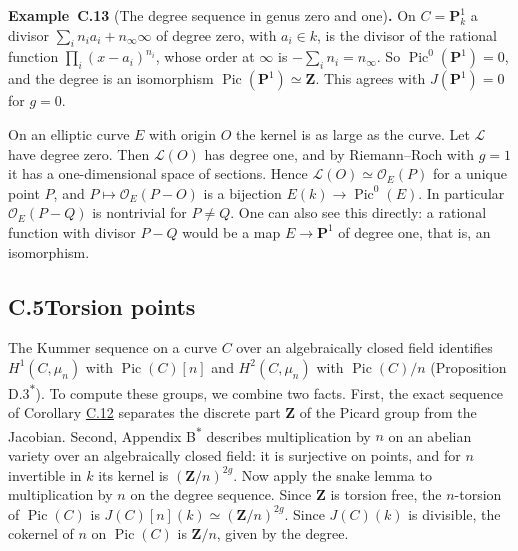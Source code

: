 \documentclass[11pt]{article}
\newenvironment{bpstatement}[2]{\par\addvspace{0.6\baselineskip}\noindent\textbf{#1}#2\textbf{.}\enspace\ignorespaces}
  {\par\addvspace{0.4\baselineskip}}
\newcommand{\bpout}[1]{#1\textsuperscript{\hyperlink{bp-outside}{\ensuremath{\ast}}}}
\begin{document}
\label{bp41}%
\begin{bpstatement}{Example~C.13}{ (The degree sequence in genus zero and one)}
On \(C=\mathbf P^1_k\) a divisor \(\sum_in_ia_i+n_\infty\infty\) of degree zero, with \(a_i\in k\), is the divisor of the rational function \(\prod_i(x-a_i)^{n_i}\), whose order at \(\infty\) is \(-\sum_in_i=n_\infty\). So \(\operatorname{Pic}^0(\mathbf P^1)=0\), and the degree is an isomorphism \(\operatorname{Pic}(\mathbf P^1)\simeq\mathbf Z\). This agrees with \(J(\mathbf P^1)=0\) for \(g=0\).

On an elliptic curve \(E\) with origin \(O\) the kernel is as large as the curve. Let \(\mathcal L\) have degree zero. Then \(\mathcal L(O)\) has degree one, and by Riemann–Roch with \(g=1\) it has a one-dimensional space of sections. Hence \(\mathcal L(O)\simeq\mathcal O_E(P)\) for a unique point \(P\), and \(P\mapsto\mathcal O_E(P-O)\) is a bijection \(E(k)\to\operatorname{Pic}^0(E)\). In particular \(\mathcal O_E(P-Q)\) is nontrivial for \(P\neq Q\). One can also see this directly: a rational function with divisor \(P-Q\) would be a map \(E\to\mathbf P^1\) of degree one, that is, an isomorphism.
\end{bpstatement}


\subsection*{\texorpdfstring{C.5\quad Torsion points}{C.5 Torsion points}}
\label{bp42}%
\label{bp43}%
The Kummer sequence on a curve \(C\) over an algebraically closed field identifies \(H^1(C,\mu_n)\) with \(\operatorname{Pic}(C)[n]\) and \(H^2(C,\mu_n)\) with \(\operatorname{Pic}(C)/n\) (Proposition \bpout{D.3}). To compute these groups, we combine two facts. First, the exact sequence of Corollary \hyperref[bp39]{C.12} separates the discrete part \(\mathbf Z\) of the Picard group from the Jacobian. Second, Appendix \bpout{B} describes multiplication by \(n\) on an abelian variety over an algebraically closed field: it is surjective on points, and for \(n\) invertible in \(k\) its kernel is \((\mathbf Z/n)^{2g}\). Now apply the snake lemma to multiplication by \(n\) on the degree sequence. Since \(\mathbf Z\) is torsion free, the \(n\)-torsion of \(\operatorname{Pic}(C)\) is \(J(C)[n](k)\simeq(\mathbf Z/n)^{2g}\). Since \(J(C)(k)\) is divisible, the cokernel of \(n\) on \(\operatorname{Pic}(C)\) is \(\mathbf Z/n\), given by the degree.
\end{document}
